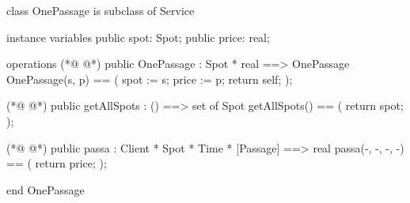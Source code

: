 \begin{vdmpp}[breaklines=true]
class OnePassage is subclass of Service

instance variables
 public spot: Spot;
 public price: real;
 
operations
(*@
\label{OnePassage:8}
@*)
 public OnePassage : Spot * real ==> OnePassage
  OnePassage(s, p) == (
   spot := s;
   price := p;
  return self;
 );
 
(*@
\label{getAllSpots:15}
@*)
 public getAllSpots : () ==> set of Spot
 getAllSpots() == (
    return {spot};
 );
 
(*@
\label{passa:20}
@*)
 public passa : Client * Spot * Time * [Passage] ==> real
 passa(-, -, -, -) == (
  return price;
 );
 
end OnePassage
\end{vdmpp}
